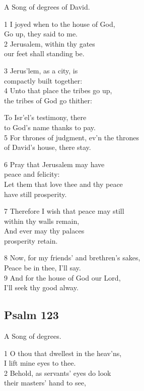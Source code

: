 \begin{multicols}{3}
A Song of degrees of David.

1 I joyed when to the house of God,\\
Go up, they said to me.\\
2 Jerusalem, within thy gates\\
our feet shall standing be.

3 Jerus’lem, as a city, is\\
compactly built together:\\
4 Unto that place the tribes go up,\\
the tribes of God go thither:

To Isr’el’s testimony, there\\
to God’s name thanks to pay.\\
5 For thrones of judgment, ev’n the thrones\\
of David’s house, there stay.

6 Pray that Jerusalem may have\\
peace and felicity:\\
Let them that love thee and thy peace\\
have still prosperity.

7 Therefore I wish that peace may still\\
within thy walls remain,\\
And ever may thy palaces\\
prosperity retain.

8 Now, for my friends’ and brethren’s sakes,\\
Peace be in thee, I’ll say.\\
9 And for the house of God our Lord,\\
I’ll seek thy good alway.

\begin{center}
\quad{}\quad{}
\end{center}

\subsection*{Psalm 123}

A Song of degrees.

1 O thou that dwellest in the heav’ns,\\
I lift mine eyes to thee.\\
2 Behold, as servants’ eyes do look\\
their masters’ hand to see,


\end{multicols}
